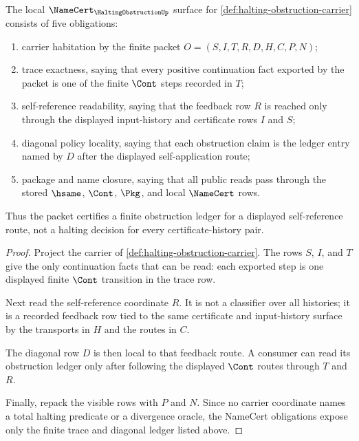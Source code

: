 \begin{theorem}
\label{thm:halting-obstruction-namecert-obligations}
The local $\NameCert_{\HaltingObstructionUp}$ surface for \autoref{def:halting-obstruction-carrier} consists of five obligations:
\begin{enumerate}
\item carrier habitation by the finite packet $O=(S,I,T,R,D,H,C,P,N)$;
\item trace exactness, saying that every positive continuation fact exported by the packet is one of the finite $\Cont$ steps recorded in $T$;
\item self-reference readability, saying that the feedback row $R$ is reached only through the displayed input-history and certificate rows $I$ and $S$;
\item diagonal policy locality, saying that each obstruction claim is the ledger entry named by $D$ after the displayed self-application route;
\item package and name closure, saying that all public reads pass through the stored $\hsame$, $\Cont$, $\Pkg$, and local $\NameCert$ rows.
\end{enumerate}
Thus the packet certifies a finite obstruction ledger for a displayed self-reference route, not a halting decision for every certificate-history pair.
\end{theorem}
\begin{proof}
Project the carrier of \autoref{def:halting-obstruction-carrier}. The rows $S$, $I$, and $T$ give the only continuation facts that can be read: each exported step is one displayed finite $\Cont$ transition in the trace row.

Next read the self-reference coordinate $R$. It is not a classifier over all histories; it is a recorded feedback row tied to the same certificate and input-history surface by the transports in $H$ and the routes in $C$.

The diagonal row $D$ is then local to that feedback route. A consumer can read its obstruction ledger only after following the displayed $\Cont$ routes through $T$ and $R$.

Finally, repack the visible rows with $P$ and $N$. Since no carrier coordinate names a total halting predicate or a divergence oracle, the NameCert obligations expose only the finite trace and diagonal ledger listed above.
\end{proof}

